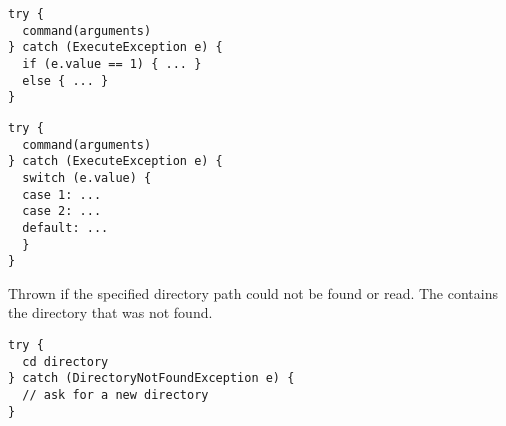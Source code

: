 \begin{lstlisting}[style=Groovybash, label={lst:example_execute_exception1}]
try {
  command(arguments)
} catch (ExecuteException e) {
  if (e.value == 1) { ... }
  else { ... }
}
\end{lstlisting}

\begin{lstlisting}[style=Groovybash, label={lst:example_execute_exception2}]
try {
  command(arguments)
} catch (ExecuteException e) {
  switch (e.value) {
  case 1: ...
  case 2: ...
  default: ...
  }
}
\end{lstlisting}

%

Thrown if the specified directory path could not be found or read. 
The  contains the directory \cite{file13}
that was not found.

\begin{lstlisting}[style=Groovybash, label={lst:example_execute_exception1}]
try {
  cd directory
} catch (DirectoryNotFoundException e) {
  // ask for a new directory
}
\end{lstlisting}

